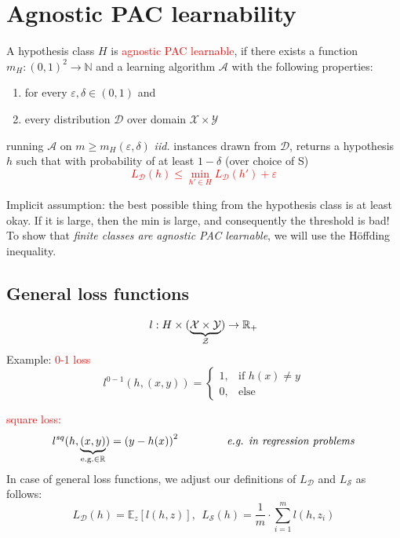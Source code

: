 \documentclass[10pt,a4paper]{article}
\theoremstyle{remark}
\theoremstyle{definition}
\theoremstyle{plain}
\begin{document}
\section{Agnostic PAC learnability}
\begin{boxeddef}
	A hypothesis class $H$ is \textcolor{red}{agnostic PAC learnable}, if there exists a function $m_H: (0,1)^2 \to \mathbb{N}$ and a learning algorithm $\mathcal{A}$ with the following properties:
	\begin{enumerate}
		\item for every $\varepsilon, \delta \in (0,1)$ and
		\item every distribution $\mathcal{D}$ over domain $\mathcal{X} \times \mathcal{Y}$
	\end{enumerate}
	running $\mathcal{A}$ on $m \geq m_H(\varepsilon, \delta)$ \textit{iid.} instances drawn from $\mathcal{D}$, returns a hypothesis $h$ such that with probability of at least $1-\delta$ (over choice of S) 
	\textcolor{red}{$$ 
		L_{\mathcal{D}}(h) \leq \min_{h' \in H} L_{\mathcal{D}}(h') + \varepsilon
		$$}
\end{boxeddef}
Implicit assumption: the best possible thing from the hypothesis class is at least okay. If it is large, then the min is large, and consequently the threshold is bad!\\
To show that \textit{finite classes are agnostic PAC learnable}, we will use the Höffding inequality.

\subsection{General loss functions}
	$$ l: H \times ( \underbrace{\mathcal{X} \times \mathcal{Y}}_{\mathclap{\mathcal{Z}}}) \to \mathbb{R}_+ $$
Example: \textcolor{red}{0-1 loss}\\
$$ l^{0-1}\left( h, \left(x,y\right) \right) = \begin{cases}
	1, &  \text{if } h(x) \neq y  \\
	0, &  \text{else} 
\end{cases}$$

\textcolor{red}{square loss:}
$$
l^{sq}(h, \underbrace{\left(x,y\right)}_{\text{e.g.} \in \mathbb{R}}) =  \left(y-h(x)\right)^2 \hspace{1.5cm}\text{\textit{e.g. in regression problems}}
$$
In case of general loss functions, we adjust our definitions of $L_\mathcal{D}$ and $L_\mathcal{S}$ as follows:
$$ 
L_\mathcal{D}(h) =  \mathbb{E}_z[l(h, z)], \ \  L_\mathcal{S}(h) = \frac{1}{m} \cdot \sum_{i = 1}^{m} l(h, z_i)
$$
\end{document}
